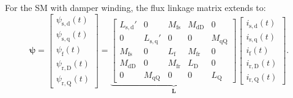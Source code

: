 \begin{solutionblock}
    For the SM with damper winding, the flux linkage matrix extends to:
    \begin{equation}
        \bm{\psi} = 
        \begin{bmatrix}
            \psi_{\mathrm{s,d}}(t) \\
            \psi_{\mathrm{s,q}}(t) \\
            \psi_{\mathrm{f}}(t) \\
            \psi_{\mathrm{r,D}}(t) \\
            \psi_{\mathrm{r,Q}}(t)
        \end{bmatrix}
        =
        \underbrace{
        \begin{bmatrix}
            L_{\mathrm{s,d}}' & 0 & M_{\mathrm{fs}} & M_{\mathrm{dD}} & 0 \\
            0 & L_{\mathrm{s,q}}' & 0 & 0 & M_{\mathrm{qQ}} \\
            M_{\mathrm{fs}} & 0 & L_{\mathrm{f}} & M_{\mathrm{fr}} & 0 \\
            M_{\mathrm{dD}} & 0 & M_{\mathrm{fr}} & L_{\mathrm{D}} & 0 \\
            0 & M_{\mathrm{qQ}} & 0 & 0 & L_{\mathrm{Q}}
        \end{bmatrix}
        }_{\bm{L}}
        \begin{bmatrix}
            i_{\mathrm{s,d}}(t) \\
            i_{\mathrm{s,q}}(t) \\
            i_{\mathrm{f}}(t) \\
            i_{\mathrm{r,D}}(t) \\
            i_{\mathrm{r,Q}}(t)
        \end{bmatrix}.
    \end{equation}


\end{solutionblock}
